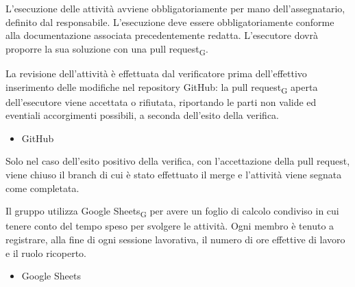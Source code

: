 L'esecuzione delle attività avviene obbligatoriamente per mano dell'assegnatario, definito dal responsabile. L'esecuzione deve essere obbligatoriamente conforme alla documentazione associata precedentemente redatta. L'esecutore dovrà proporre la sua soluzione con una pull request\textsubscript{G}.

La revisione dell'attività è effettuata dal verificatore prima dell'effettivo inserimento delle modifiche nel repository GitHub: la pull request\textsubscript{G} aperta dell'esecutore viene accettata o rifiutata, riportando le parti non valide ed eventiali accorgimenti possibili, a seconda dell'esito della verifica.
    \begin{itemize}
        \item GitHub
    \end{itemize}

Solo nel caso dell'esito positivo della verifica, con l'accettazione della pull request, viene chiuso il branch di cui è stato effettuato il merge e l'attività viene segnata come completata. 

Il gruppo utilizza Google Sheets\textsubscript{G} per avere un foglio di calcolo condiviso in cui tenere conto del tempo speso per svolgere le attività. Ogni membro è tenuto a registrare, alla fine di ogni sessione lavorativa, il numero di ore effettive di lavoro e il ruolo ricoperto.
    \begin{itemize}
        \item Google Sheets
    \end{itemize}


